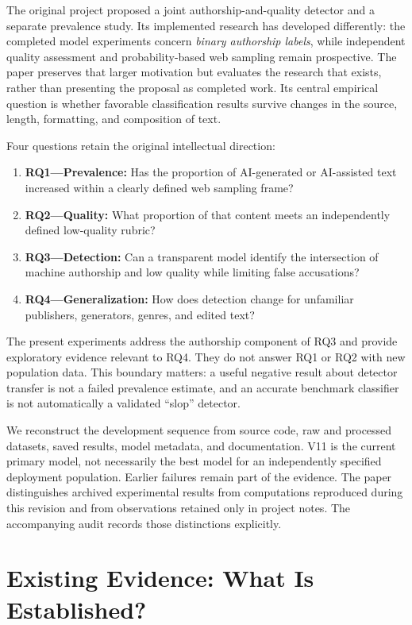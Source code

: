 \documentclass[11pt]{article}
\begin{document}
The original project proposed a joint authorship-and-quality detector and a
separate prevalence study. Its implemented research has developed differently:
the completed model experiments concern \emph{binary authorship labels}, while
independent quality assessment and probability-based web sampling remain
prospective. The paper preserves that larger motivation but evaluates the
research that exists, rather than presenting the proposal as completed work.
Its central empirical question is whether favorable classification results
survive changes in the source, length, formatting, and composition of text.

Four questions retain the original intellectual direction:
\begin{enumerate}
\item \textbf{RQ1---Prevalence:} Has the proportion of AI-generated or
AI-assisted text increased within a clearly defined web sampling frame?
\item \textbf{RQ2---Quality:} What proportion of that content meets an
independently defined low-quality rubric?
\item \textbf{RQ3---Detection:} Can a transparent model identify the
intersection of machine authorship and low quality while limiting false
accusations?
\item \textbf{RQ4---Generalization:} How does detection change for unfamiliar
publishers, generators, genres, and edited text?
\end{enumerate}
The present experiments address the authorship component of RQ3 and provide
exploratory evidence relevant to RQ4. They do not answer RQ1 or RQ2 with new
population data. This boundary matters: a useful negative result about detector
transfer is not a failed prevalence estimate, and an accurate benchmark
classifier is not automatically a validated ``slop'' detector.

We reconstruct the development sequence from source code, raw and processed
datasets, saved results, model metadata, and documentation. V11 is the current
primary model, not necessarily the best model for an independently specified
deployment population. Earlier failures remain part of the evidence. The
paper distinguishes archived experimental results from computations reproduced
during this revision and from observations retained only in project notes.
The accompanying audit records those distinctions explicitly.

\section{Existing Evidence: What Is Established?}
\end{document}
